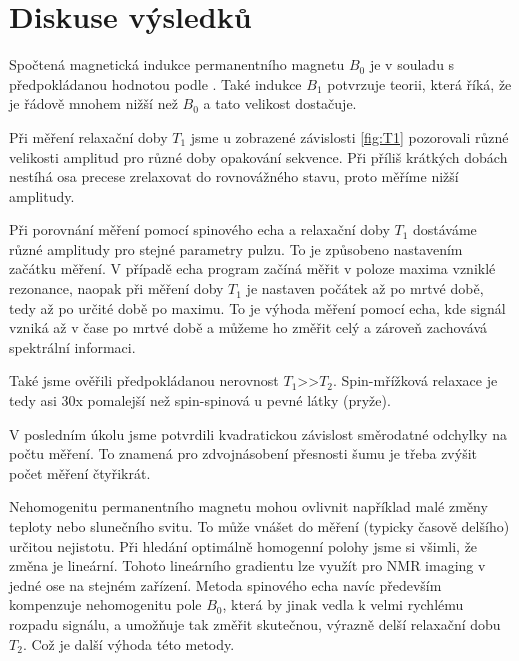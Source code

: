     
\section{Diskuse výsledků}
Spočtená magnetická indukce permanentního magnetu $B_0$ je v souladu s předpokládanou hodnotou podle \cite{bib:studijni-text}. Také indukce $B_1$ potvrzuje teorii, která říká, že je řádově mnohem nižší než $B_0$ a tato velikost dostačuje.

Při měření relaxační doby $T_1$ jsme u zobrazené závislosti \ref{fig:T1} pozorovali různé velikosti amplitud pro různé doby opakování sekvence. Při příliš krátkých dobách nestíhá osa precese zrelaxovat do rovnovážného stavu, proto měříme nižší amplitudy.

Při porovnání měření pomocí spinového echa a relaxační doby $T_1$ dostáváme různé amplitudy pro stejné parametry pulzu. To je způsobeno nastavením začátku měření. V případě echa program začíná měřit v poloze maxima vzniklé rezonance, naopak při měření doby $T_1$ je nastaven počátek až po mrtvé době, tedy až po určité době po maximu. To je výhoda měření pomocí echa, kde signál vzniká až v čase po mrtvé době a můžeme ho změřit celý a zároveň zachovává spektrální informaci.

Také jsme ověřili předpokládanou nerovnost $T_1$>>$T_2$. Spin-mřížková relaxace je tedy asi 30x pomalejší než spin-spinová u pevné látky (pryže).

V posledním úkolu jsme potvrdili kvadratickou závislost směrodatné odchylky na počtu měření. To znamená pro zdvojnásobení přesnosti šumu je třeba zvýšit počet měření čtyřikrát.

Nehomogenitu permanentního magnetu mohou ovlivnit například malé změny teploty nebo slunečního svitu. To může vnášet do měření (typicky časově delšího) určitou nejistotu. Při hledání optimálně homogenní polohy jsme si všimli, že změna je lineární. Tohoto lineárního gradientu lze využít pro NMR imaging v jedné ose na stejném zařízení. Metoda spinového echa navíc především kompenzuje nehomogenitu pole $B_0$, která by jinak vedla k velmi rychlému rozpadu signálu, a umožňuje tak změřit skutečnou, výrazně delší relaxační dobu $T_2$. Což je další výhoda této metody.



